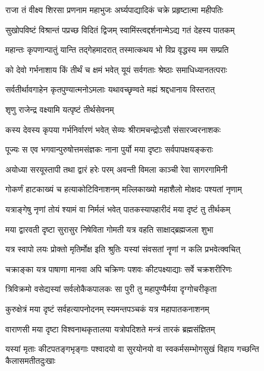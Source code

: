 \twolineshloka
{राजा तं वीक्ष्य शिरसा प्रणनाम महाभुजः}
{अर्घ्यपाद्यादिकं चक्रे प्रहृष्टात्मा महीपतिः}%

\twolineshloka
{सुखोपविष्टं विश्रान्तं पप्रच्छ विदितं द्विजम्}
{स्वामिंस्त्वद्दर्शनान्मेऽद्य गतं देहस्य पातकम्}%

\twolineshloka
{महान्तः कृपणान्पातुं यान्ति तद्गेहमादरात्}
{तस्मात्कथय भो विप्र वृद्धस्य मम सम्प्रति}%

\twolineshloka
{को देवो गर्भनाशाय किं तीर्थं च क्षमं भवेत्}
{यूयं सर्वगताः श्रेष्ठाः समाधिध्यानतत्पराः}%

\twolineshloka
{सर्वतीर्थावगाहेन कृतपुण्यात्मनोऽमलाः}
{यथावच्छृण्वते मह्यं श्रद्दधानाय विस्तरात्}%



\onelineshloka
{शृणु राजेन्द्र वक्ष्यामि यत्पृष्टं तीर्थसेवनम्}%

\twolineshloka
{कस्य देवस्य कृपया गर्भनिर्वारणं भवेत्}
{सेव्यः श्रीरामचन्द्रोऽसौ संसारज्वरनाशकः}%

\twolineshloka
{पूज्यः स एव भगवान्पुरुषोत्तमसंज्ञकः}
{नाना पुर्यो मया दृष्टाः सर्वपापक्षयङ्कराः}%

\twolineshloka
{अयोध्या सरयूस्तापी तथा द्वारं हरेः परम्}
{अवन्ती विमला काञ्ची रेवा सागरगामिनी}%

\twolineshloka
{गोकर्णं हाटकाख्यं च हत्याकोटिविनाशनम्}
{मल्लिकाख्यो महाशैलो मोक्षदः पश्यतां नृणाम्}%

\twolineshloka
{यत्राङ्गेषु नृणां तोयं श्यामं वा निर्मलं भवेत्}
{पातकस्यापहारीदं मया दृष्टं तु तीर्थकम्}%

\twolineshloka
{मया द्वारवती दृष्टा सुरासुर निषेविता}
{गोमती यत्र वहति साक्षाद्ब्रह्मजला शुभा}%

\twolineshloka
{यत्र स्वापो लयः प्रोक्तो मृतिर्मोक्ष इति श्रुतिः}
{यस्यां संवसतां नॄणां न कलि प्रभवेत्क्वचित्}%

\twolineshloka
{चक्राङ्का यत्र पाषाणा मानवा अपि चक्रिणः}
{पशवः कीटपक्ष्याद्याः सर्वे चक्रशरीरिणः}%

\twolineshloka
{त्रिविक्रमो वसेद्यस्यां सर्वलोकैकपालकः}
{सा पुरी तु महापुण्यैर्मया दृग्गोचरीकृता}%

\twolineshloka
{कुरुक्षेत्रं मया दृष्टं सर्वहत्यापनोदनम्}
{स्यमन्तपञ्चकं यत्र महापातकनाशनम्}%

\twolineshloka
{वाराणसी मया दृष्टा विश्वनाथकृतालया}
{यत्रोपदिशते मन्त्रं तारकं ब्रह्मसंज्ञितम्}%

\fourlineindentedshloka
{यस्यां मृताः कीटपतङ्गभृङ्गाः}
{पश्वादयो वा सुरयोनयो वा}
{स्वकर्मसम्भोगसुखं विहाय}
{गच्छन्ति कैलासमतीतदुःखाः}%

